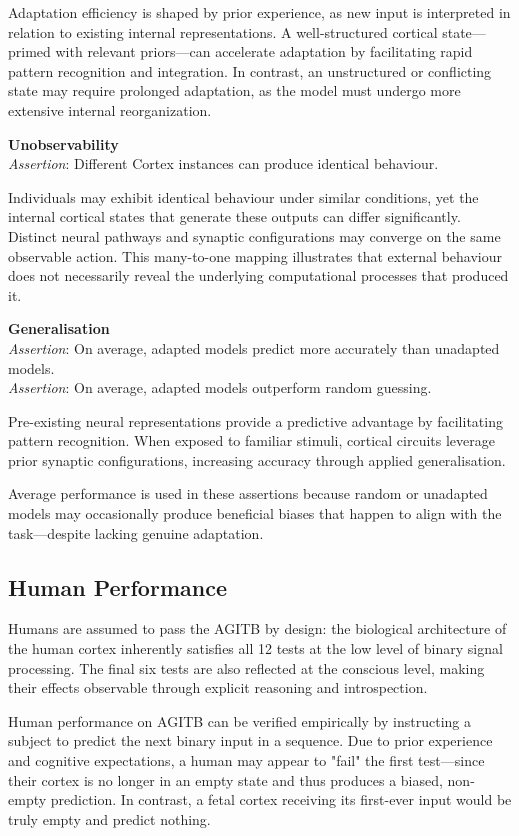 \documentclass{article}
\newcommand{\agitbtest}[2]{
 \item \textbf{#1} \\
 #2
}
\begin{document}
\begin{agitblist}
{Adaptation efficiency is shaped by prior experience, as new input is interpreted in relation to existing internal representations. A well-structured cortical state—primed with relevant priors—can accelerate adaptation by facilitating rapid pattern recognition and integration. In contrast, an unstructured or conflicting state may require prolonged adaptation, as the model must undergo more extensive internal reorganization.
}
\agitbtest{Unobservability}{
\emph{Assertion}: Different Cortex instances can produce identical behaviour.

Individuals may exhibit identical behaviour under similar conditions, yet the internal cortical states that generate these outputs can differ significantly. Distinct neural pathways and synaptic configurations may converge on the same observable action. This many-to-one mapping illustrates that external behaviour does not necessarily reveal the underlying computational processes that produced it.
}
\agitbtest{Generalisation}{
\emph{Assertion}: On average, adapted models predict more accurately than unadapted models.\\
\emph{Assertion}: On average, adapted models outperform random guessing.

Pre-existing neural representations provide a predictive advantage by facilitating pattern recognition. When exposed to familiar stimuli, cortical circuits leverage prior synaptic configurations, increasing accuracy through applied generalisation.

Average performance is used in these assertions because random or unadapted models may occasionally produce beneficial biases that happen to align with the task—despite lacking genuine adaptation.
}
\end{agitblist}

\subsection{Human Performance}
Humans are assumed to pass the AGITB by design: the biological architecture of the human cortex inherently satisfies all 12 tests at the low level of binary signal processing. The final six tests are also reflected at the conscious level, making their effects observable through explicit reasoning and introspection.

Human performance on AGITB can be verified empirically by instructing a subject to predict the next binary input in a sequence. Due to prior experience and cognitive expectations, a human may appear to "fail" the first test—since their cortex is no longer in an empty state and thus produces a biased, non-empty prediction. In contrast, a fetal cortex receiving its first-ever input would be truly empty and predict nothing.
\end{document}
